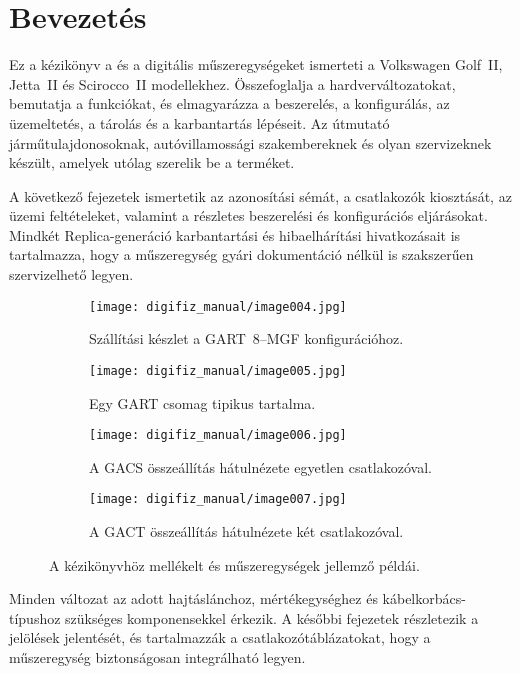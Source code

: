 \chapter{Bevezetés}\label{ch:introduction}

Ez a kézikönyv a \ReplicaGenOne{} és a \ReplicaNextLong{} digitális műszeregységeket ismerteti a Volkswagen Golf~II, Jetta~II és Scirocco~II modellekhez. Összefoglalja a hardverváltozatokat, bemutatja a funkciókat, és elmagyarázza a beszerelés, a konfigurálás, az üzemeltetés, a tárolás és a karbantartás lépéseit. Az útmutató járműtulajdonosoknak, autóvillamossági szakembereknek és olyan szervizeknek készült, amelyek utólag szerelik be a terméket.

A következő fejezetek ismertetik az azonosítási sémát, a csatlakozók kiosztását, az üzemi feltételeket, valamint a részletes beszerelési és konfigurációs eljárásokat. Mindkét Replica-generáció karbantartási és hibaelhárítási hivatkozásait is tartalmazza, hogy a műszeregység gyári dokumentáció nélkül is szakszerűen szervizelhető legyen.

\begin{figure}[htbp]
    \centering
    \begin{subfigure}{0.48\textwidth}
        \texttt{[image: digifiz\_manual/image004.jpg]}
        \caption{Szállítási készlet a GART~8--MGF konfigurációhoz.}
    \end{subfigure}\hfill
    \begin{subfigure}{0.48\textwidth}
        \texttt{[image: digifiz\_manual/image005.jpg]}
        \caption{Egy GART csomag tipikus tartalma.}
    \end{subfigure}
    \begin{subfigure}{0.48\textwidth}
        \texttt{[image: digifiz\_manual/image006.jpg]}
        \caption{A GACS összeállítás hátulnézete egyetlen csatlakozóval.}
    \end{subfigure}\hfill
    \begin{subfigure}{0.48\textwidth}
        \texttt{[image: digifiz\_manual/image007.jpg]}
        \caption{A GACT összeállítás hátulnézete két csatlakozóval.}
    \end{subfigure}
    \caption{A kézikönyvhöz mellékelt \ReplicaGenOne{} és \ReplicaNextLong{} műszeregységek jellemző példái.}
\end{figure}

Minden változat az adott hajtáslánchoz, mértékegységhez és kábelkorbács-típushoz szükséges komponensekkel érkezik. A későbbi fejezetek részletezik a jelölések jelentését, és tartalmazzák a csatlakozótáblázatokat, hogy a műszeregység biztonságosan integrálható legyen.
